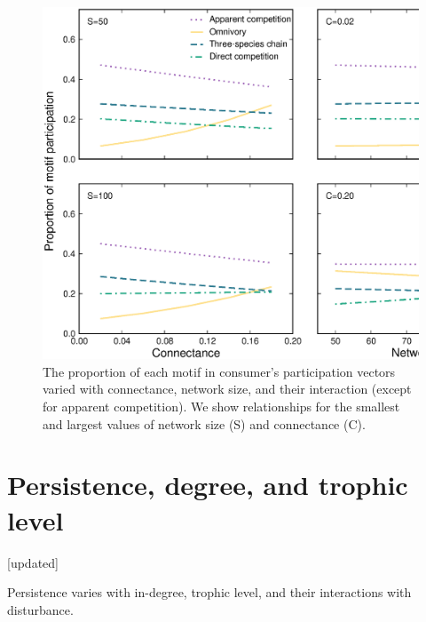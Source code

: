\documentclass[12pt]{article}
\begin{document}
\begin{spacing}{2.0}
    \begin{figure}[ht!]
        \centering
        \includegraphics[width=.9\textwidth]{figures/participation_vs_SC.eps}
        \caption{The proportion of each motif in consumer's participation vectors varied with connectance, network size, and their interaction (except for apparent competition). We show relationships for the smallest and largest values of network size (S) and connectance (C).}
        \label{fig:roles_vs_SC}
    \end{figure}


    
\clearpage 

\section{Persistence, degree, and trophic level} [updated]


    Persistence varies with in-degree, trophic level, and their interactions with disturbance.


\end{spacing}
\end{document}
